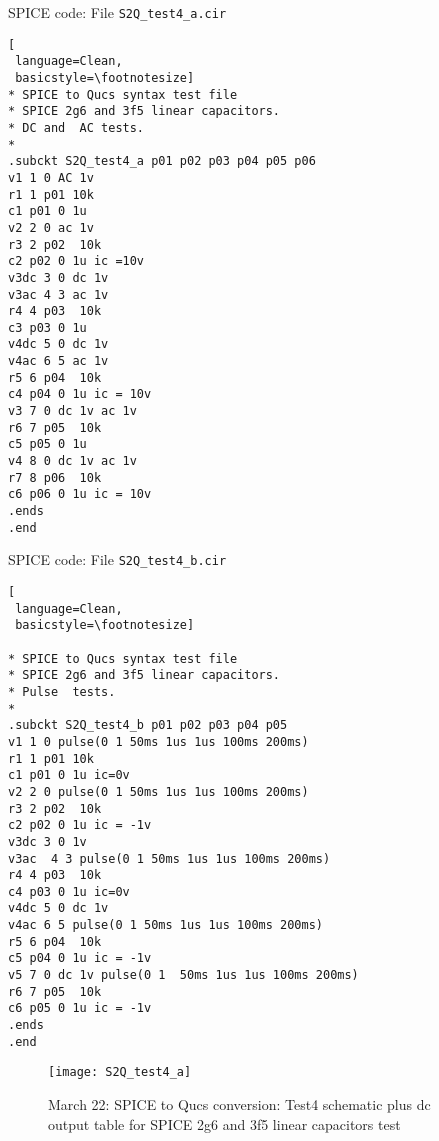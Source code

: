 \begin{flushleft}

SPICE code: File \verb|S2Q_test4_a.cir|

\end{flushleft}

\begin{lstlisting}[
 language=Clean, 
 basicstyle=\footnotesize]
* SPICE to Qucs syntax test file 
* SPICE 2g6 and 3f5 linear capacitors.
* DC and  AC tests.
*
.subckt S2Q_test4_a p01 p02 p03 p04 p05 p06
v1 1 0 AC 1v
r1 1 p01 10k
c1 p01 0 1u
v2 2 0 ac 1v
r3 2 p02  10k
c2 p02 0 1u ic =10v
v3dc 3 0 dc 1v
v3ac 4 3 ac 1v
r4 4 p03  10k
c3 p03 0 1u 
v4dc 5 0 dc 1v
v4ac 6 5 ac 1v
r5 6 p04  10k
c4 p04 0 1u ic = 10v 
v3 7 0 dc 1v ac 1v
r6 7 p05  10k
c5 p05 0 1u 
v4 8 0 dc 1v ac 1v
r7 8 p06  10k
c6 p06 0 1u ic = 10v 
.ends
.end
\end{lstlisting}

\begin{flushleft}

SPICE code: File \verb|S2Q_test4_b.cir|
\end{flushleft}

\begin{lstlisting}[
 language=Clean, 
 basicstyle=\footnotesize]

* SPICE to Qucs syntax test file 
* SPICE 2g6 and 3f5 linear capacitors.
* Pulse  tests.
*
.subckt S2Q_test4_b p01 p02 p03 p04 p05 
v1 1 0 pulse(0 1 50ms 1us 1us 100ms 200ms)
r1 1 p01 10k
c1 p01 0 1u ic=0v
v2 2 0 pulse(0 1 50ms 1us 1us 100ms 200ms)
r3 2 p02  10k
c2 p02 0 1u ic = -1v
v3dc 3 0 1v
v3ac  4 3 pulse(0 1 50ms 1us 1us 100ms 200ms)
r4 4 p03  10k
c4 p03 0 1u ic=0v
v4dc 5 0 dc 1v
v4ac 6 5 pulse(0 1 50ms 1us 1us 100ms 200ms)
r5 6 p04  10k
c5 p04 0 1u ic = -1v 
v5 7 0 dc 1v pulse(0 1  50ms 1us 1us 100ms 200ms)
r6 7 p05  10k
c6 p05 0 1u ic = -1v 
.ends
.end
\end{lstlisting} 



\begin{figure}
  \centering
  \texttt{[image: S2Q\_test4\_a]}
  \caption{March 22: SPICE to Qucs conversion: Test4 schematic plus dc output table for SPICE 2g6 and 3f5 linear capacitors test}
  \label{fig:S2Qtest4_1}
\end{figure} 

